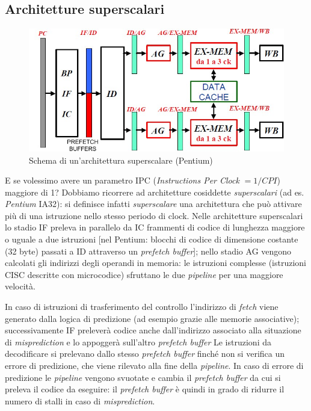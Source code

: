 \subsection{Architetture superscalari}
\label{sec:superscalarArchitectures}

\begin{figure}[!h]
\centering
\includegraphics[width=0.9\columnwidth]{img/superscalare}
\caption{Schema di un'architettura superscalare (Pentium)}
\label{fig:superscalare}
\end{figure}

E se volessimo avere un parametro IPC (\textit{Instructions Per Clock} $= 1/CPI$) maggiore di 1? Dobbiamo ricorrere ad architetture cosiddette \textit{superscalari} (ad es. \textit{Pentium} IA32): si definisce infatti \textit{superscalare} una architettura che può attivare più di una istruzione nello stesso periodo di clock.
Nelle architetture superscalari lo stadio IF preleva in parallelo da IC frammenti di codice di
lunghezza maggiore o uguale a due istruzioni [nel Pentium: blocchi di codice di dimensione costante (32 byte) passati a ID attraverso un \textit{prefetch buffer}]; nello stadio AG vengono calcolati gli indirizzi degli operandi in memoria: le istruzioni complesse (istruzioni CISC descritte con microcodice) sfruttano le due \textit{pipeline} per una maggiore velocità.

In caso di istruzioni di trasferimento del controllo l'indirizzo di \textit{fetch} viene generato
dalla logica di predizione (ad esempio grazie alle memorie associative); successivamente IF preleverà codice anche dall'indirizzo associato alla situazione di \textit{misprediction} e lo appoggerà sull'altro \textit{prefetch buffer} Le istruzioni da decodificare si prelevano dallo stesso \textit{prefetch buffer} finché non si
verifica un errore di predizione, che viene rilevato alla fine della \textit{pipeline}. In caso di errore di predizione le \textit{pipeline} vengono svuotate e cambia il \textit{prefetch buffer} da cui si preleva il codice da eseguire: il \textit{prefetch buffer} è quindi in grado di ridurre il numero di stalli in caso di \textit{misprediction}.

